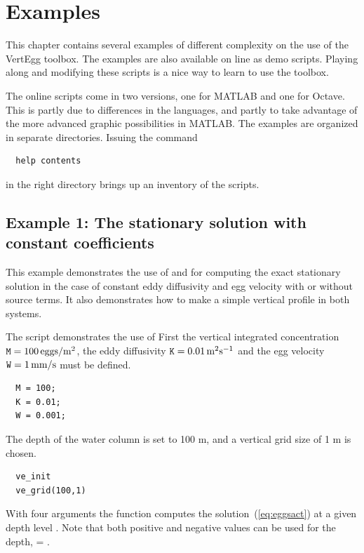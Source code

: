 %  
%  
\chapter{Examples}

This chapter contains several examples of different complexity on the
use of the VertEgg toolbox. The examples are also available on line
as demo scripts. Playing along and modifying these scripts is a nice
way to learn to use the toolbox. 

The online scripts come in two versions, one for MATLAB and one for
Octave. This is partly due to differences in the languages, and partly
to take advantage of the more advanced graphic possibilities in MATLAB.
The examples are organized in separate directories. Issuing the command
\begin{verbatim}
  help contents
\end{verbatim}
in the right directory brings up an inventory of the scripts.

\section{Example 1: The stationary solution with constant
  coefficients}

This example demonstrates the use of  and 
for computing the
exact stationary solution in the case of constant eddy diffusivity and
egg velocity with or without source terms. 
It also demonstrates how to make a simple vertical
profile in both systems. 

The script  demonstrates the use of 
First the vertical integrated concentration
${\mbox{\texttt{M}}} = 100 \, \mbox{eggs}/\mbox{m}^2$, the eddy diffusivity 
${\mbox{\texttt{K}}} = 0.01 \, \mbox{m}^2 \mbox{s}^{-1}$ and the egg velocity
${\mbox{\texttt{W}}} = 1 \, \mbox{mm} / \mbox{s}$ must be defined.
\begin{verbatim}
  M = 100; 
  K = 0.01;  
  W = 0.001;
\end{verbatim}
The depth of the water column  is set to 100 m, and a 
vertical grid size  of 1 m is chosen.
\begin{verbatim}
  ve_init 
  ve_grid(100,1)
\end{verbatim}

With four arguments the function  computes the
solution~(\ref{eq:eggsact}) at a given depth level . Note that
both positive and negative values can be used for the depth,
 = .

